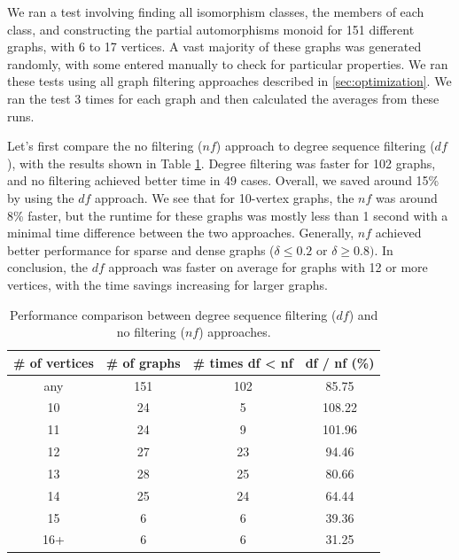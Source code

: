 We ran a test involving finding all isomorphism classes, the members of each class, and constructing the partial automorphisms monoid for 151 different graphs, with 6 to 17 vertices. A vast majority of these graphs was generated randomly, with some entered manually to check for particular properties. We ran these tests using all graph filtering approaches described in \ref{sec:optimization}. We ran the test 3 times for each graph and then calculated the averages from these runs.

Let's first compare the no filtering ($nf$) approach to degree sequence filtering ($df$), with the results shown in Table \ref{tab:dfvsnf}. Degree filtering was faster for 102 graphs, and no filtering achieved better time in 49 cases. Overall, we saved around 15\% by using the $df$ approach. We see that for 10-vertex graphs, the $nf$ was around 8\% faster, but the runtime for these graphs was mostly less than 1 second with a minimal time difference between the two approaches. Generally, $nf$ achieved better performance for sparse and dense graphs ($\delta \le 0.2$ or $\delta \ge 0.8)$. In conclusion, the $df$ approach was faster on average for graphs with 12 or more vertices, with the time savings increasing for larger graphs.

\begin{table}
\begin{tabular}{ | c | c | c | c |}
\hline
\# of vertices & \# of graphs & \# times df < nf & df / nf (\%) \\
\hline
any & 151 & 102 & 85.75 \\
10 & 24 & 5 & 108.22 \\
11 & 24 & 9 & 101.96 \\
12 & 27 & 23 & 94.46 \\
13 & 28 & 25 & 80.66 \\
14 & 25 & 24 & 64.44 \\
15 & 6 & 6 &39.36 \\
16+ & 6 & 6 & 31.25 \\
\hline
\end{tabular}
\caption{\label{tab:dfvsnf} Performance comparison between degree sequence filtering ($df$) and no filtering ($nf$) approaches.}
\end{table}

